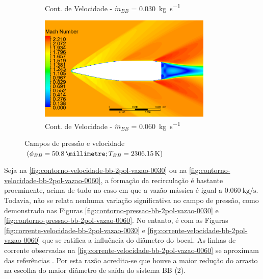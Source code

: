 \begin{figure}[!ht]
\begin{subfigure}[b]{0.47\textwidth}
        \caption{Cont. de Velocidade - \(\Dot{m}_{BB}\) = \qty{0,030}{\kilogram\per\second}}
        \label{fig:contorno-velocidade-bb-2pol-vazao0030}
    \end{subfigure}
    \hfill
	\begin{subfigure}[b]{0.47\textwidth} %
        \centering
        \includegraphics[height=5cm,width=\textwidth]{contorno-velocidade-2306K-vazao-0060-2pol.png}
        \caption{Cont. de Velocidade - \(\Dot{m}_{BB}\) = \qty{0,060}{\kilogram\per\second}}
        \label{fig:contorno-velocidade-bb-2pol-vazao0060}
    \end{subfigure}
    \caption{Campos de pressão e velocidade \(\left(\phi_{BB} = \qty{50,8}{\millimetre}; T_{BB} = \qty{2306,15}{\kelvin}\right)\)}
	\label{fig:influencia-diametro-vazao-2pol}
\end{figure}

Seja na \autoref{fig:contorno-velocidade-bb-2pol-vazao-0030} ou na \autoref{fig:contorno-velocidade-bb-2pol-vazao-0060}, a formação da recirculação é bastante proeminente, acima de tudo no caso em que a vazão mássica é igual a \(\qty{0,060}{\kilogram\per\second}\). Todavia, não se relata nenhuma variação significativa no campo de pressão, como demonstrado nas Figuras \ref{fig:contorno-pressao-bb-2pol-vazao-0030} e \ref{fig:contorno-pressao-bb-2pol-vazao-0060}. No entanto, é com as Figuras \ref{fig:corrente-velocidade-bb-2pol-vazao-0030} e \ref{fig:corrente-velocidade-bb-2pol-vazao-0060} que se ratifica a influência do diâmetro do bocal. As linhas de corrente observadas na \autoref{fig:corrente-velocidade-bb-2pol-vazao-0060} se aproximam das referências \cite{Sahu1985,Mahmoud2009,Lucena2020}. Por esta razão acredita-se que houve a maior redução do arrasto na escolha do maior diâmetro de saída do sistema BB (\qty{2}{\polegada}).

